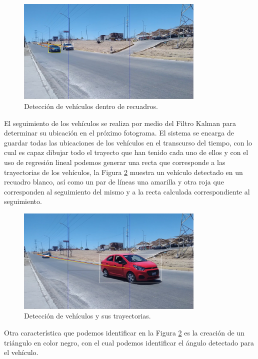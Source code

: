 \begin{figure}[H]
    \centering
    \includegraphics[width=0.8\textwidth]{Metodologia/imgs/Deteccion.jpg}
    \caption{Detección de vehículos dentro de recuadros.}
    \label{fig:LugarDeteccion}
\end{figure}

El seguimiento de los vehículos se realiza por medio del Filtro Kalman para determinar su ubicación en el próximo fotograma. El sistema se encarga de guardar todas las ubicaciones de los vehículos en el transcurso del tiempo, con lo cual es capaz dibujar todo el trayecto que han tenido cada uno de ellos y con el uso de regresión lineal podemos generar una recta que corresponde a las trayectorias de los vehículos, la Figura \ref{fig:LugarSeguimiento} muestra un vehículo detectado en un recuadro blanco, así como un par de líneas una amarilla y otra roja que corresponden al seguimiento del mismo y a la recta calculada correspondiente al seguimiento.

\begin{figure}[H]
    \centering
    \includegraphics[width=0.8\textwidth]{Metodologia/imgs/Seguimiento.jpg}
    \caption{Detección de vehículos y sus trayectorias.}
    \label{fig:LugarSeguimiento}
\end{figure}

Otra característica que podemos identificar en la Figura \ref{fig:LugarSeguimiento} es la creación de un triángulo en color negro, con el cual podemos identificar el ángulo detectado para el vehículo.

